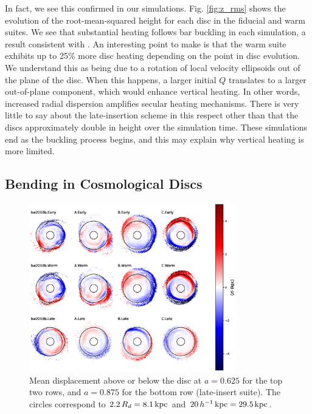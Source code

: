 In fact, we see this confirmed in our simulations.  Fig. \ref{fig:z_rms} shows the evolution of the root-mean-squared height for each disc in the fiducial and warm suites. We see that substantial heating follows bar buckling in each simulation, a result consistent with \citet{ys_2015,bauer2018b}. An interesting point to make is that the warm suite exhibits up to 25\% more disc heating depending on the point in disc evolution. We understand this as being due to a rotation of local velocity ellipsoids out of the plane of the disc. When this happens, a larger initial $Q$ translates to a larger out-of-plane component, which would enhance vertical heating. In other words, increased radial dispersion amplifies secular heating mechanisms. There is very little to say about the late-insertion scheme in this respect other than that the discs approximately double in height over the simulation time. These simulations end as the buckling process begins, and this may explain why vertical heating is more limited.\\

\subsection{Bending in Cosmological Discs}
\begin{figure}
    \centering
	\includegraphics[width=0.8\textwidth]{../figures/twelve_panel_displacements_025.eps} \caption{Mean displacement above or below the disc at $a=0.625$ for the top two rows, and $a=0.875$ for the bottom row (late-insert suite). The circles correspond to $2.2 \,R_d = 8.1\,\text{kpc}$ and $20 \, h^{-1} \, \text{kpc} = 29.5\,\text{kpc}$.  }
	\label{fig:vertical_displacement_map}
\end{figure}


